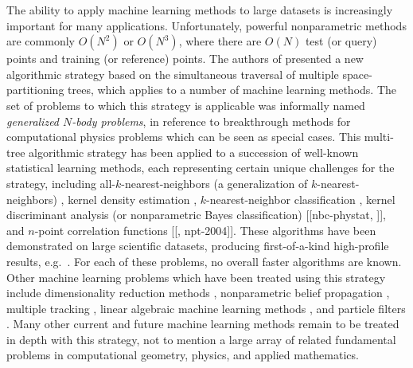 \documentclass{article}
\begin{document}
The ability to apply machine learning methods to large datasets is
increasingly important for many applications.  Unfortunately,
powerful nonparametric methods are commonly $O(N^2)$ or
$O(N^3)$, where there are $O(N)$ test (or query) points and training
(or reference) points.
The authors of \cite{nips2000paper} presented a new algorithmic strategy
based on the simultaneous traversal of multiple space-partitioning
trees, which applies to a number of machine learning methods.  The set
of problems to which this strategy is applicable was informally named
{\em generalized $N$-body problems}, in reference to breakthrough
methods for computational physics problems \cite{appel2,barnes_hut,grngard}
which can be seen as special cases.
This multi-tree algorithmic strategy has been applied to a succession
of well-known statistical learning methods, each representing certain
unique challenges for the strategy, including
all-$k$-nearest-neighbors (a generalization of $k$-nearest-neighbors)
\cite{nips2000paper}, kernel density estimation \cite{nips2000paper,
kde-siamdm, kde-aistats, kde-nips-dong, kde-uai-dong},
$k$-nearest-neighbor classification \cite{ting-liu}, kernel discriminant
analysis (or nonparametric Bayes classification) [[nbc-phystat,
\cite{nbc-compstat}]], and $n$-point correlation functions [[\cite{nips2000paper,
moore-npt}, npt-2004]].  These algorithms have been demonstrated on
large scientific datasets, producing first-of-a-kind high-profile
results, e.g.~\cite{science03, nature05}.  For each of these
problems, no overall faster algorithms are known.  Other machine
learning problems which have been treated using this strategy include
dimensionality reduction methods \cite{hochreiter00beyond}, nonparametric
belief propagation \cite{alex-ihler}, multiple tracking \cite{kbc:stch}, linear algebraic machine learning methods \cite{freitas_fast},
and particle filters \cite{klaas_fast, klaas-toward, klaas-fast}.
Many other current and future machine learning methods remain to be
treated in depth with this strategy, not to mention a large array of
related fundamental problems in computational geometry, physics, and
applied mathematics.  
\end{document}
